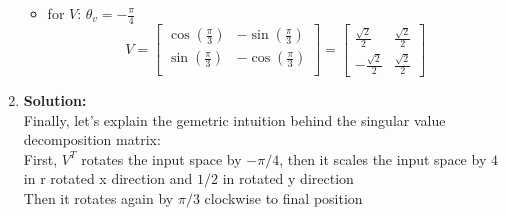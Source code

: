 \begin{enumerate}
\begin{itemize}
            \item for \( V\):
                \(\theta_v = -\frac{\pi}{4}\)\\
                \[
                    V =\begin{bmatrix}
                        \cos(\frac{\pi}{3}) & -\sin(\frac{\pi}{3})\\
                        \sin(\frac{\pi}{3}) & -\cos(\frac{\pi}{3})\\
                      \end{bmatrix}
                     = \begin{bmatrix}
                         \frac{\sqrt{2}}{2} & \frac{\sqrt{2}}{2} \\
                         -\frac{\sqrt{2}}{2} & \frac{\sqrt{2}}{2}
                       \end{bmatrix}
                \]
        \end{itemize}
    \item \textbf{Solution:}\\
        Finally, let's explain the gemetric intuition behind the singular value decomposition matrix: \\
        First, \(V^T\) rotates the input space by \(-\pi/4\), then it scales the input space by \(4\) in r
        rotated x direction and \(1/2\) in rotated y direction\\
        Then it rotates again by \(\pi/3\) clockwise to final position
\end{enumerate}

